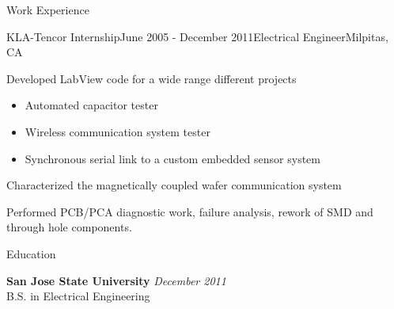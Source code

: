 \documentclass{resume} %
\begin{document}
\begin{rSection}{Work Experience}

\begin{rSubsection}{KLA-Tencor Internship}{June 2005 - December 2011}{Electrical Engineer}{Milpitas, CA}
\item Developed LabView code for a wide range different projects
\begin{itemize}
\itemsep -0.5em \vspace{-0.5em}
\renewcommand{\labelitemi}{-}
\item Automated capacitor tester
\item Wireless communication system tester
\item Synchronous serial link to a custom embedded sensor system
\end{itemize}
\item Characterized the magnetically coupled wafer communication system
\item Performed PCB/PCA diagnostic work, failure analysis, rework of SMD and through hole components.
\end{rSubsection}

\end{rSection}


\begin{rSection}{Education}

{\bf San Jose State University} \hfill {\em December 2011} \\ 
B.S. in Electrical Engineering \\

\end{rSection}





\end{document}
